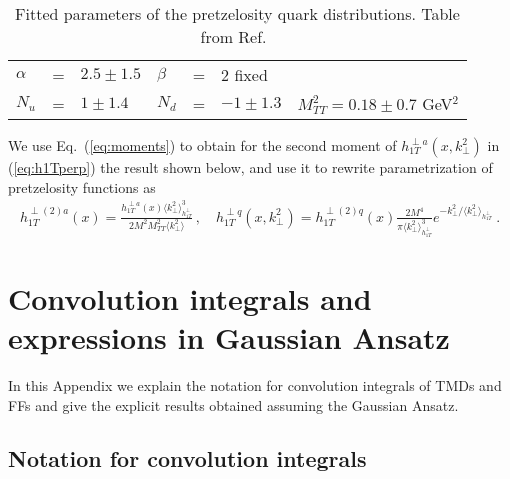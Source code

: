 \documentclass[a4paper,11pt]{article}
\newcommand{\ba}{\begin{eqnarray}}
\newcommand{\ea}{\end{eqnarray}}
\newcommand{\la}{\langle}
\newcommand{\ra}{\rangle}
\def\kperp{k_\perp}
\def\avkperp{\la \kperp^2 \ra}
\begin{document}
%
\begin{table}[b]
\centering
\begin{tabular}{l c l l c l l}
\hline
$\alpha$ &=& $2.5\pm1.5$ & $\beta$ &=& $2$ fixed \\
 $N_{u}$ &=& $1 \pm 1.4$ & $N_{d}$ &=& $-1 \pm 1.3$ &
 $M_{TT}^2=0.18 \pm  0.7$ GeV$^2$\\
\hline
\end{tabular}
\caption{Fitted parameters of the pretzelosity quark distributions. Table from Ref.~\cite{Lefky:2014eia}}
\label{fitparI}
\end{table}
%

We use Eq.~(\ref{eq:moments}) to obtain for the second moment
of $ h_{1T}^{\perp a}(x,\kperp^2)$ in (\ref{eq:h1Tperp}) the result
shown below, and use it to rewrite parametrization of pretzelosity
functions as
\ba
h_{1T}^{\perp (2) a}(x) =  \frac{h^{\perp a}_{1T}(x) \avkperp_{h_{1T}^\perp}^3}{2 M^2 M_{TT}^2 \avkperp} \, , \quad
h_{1T}^{\perp q}(x,\kperp^2) =  h_{1T}^{\perp (2) q}(x)   \frac{2 M^4}{\pi \avkperp_{h_{1T}^\perp}^3} e^{-\kperp^2/{\avkperp_{h_{1T}^\perp}}}
\label{pretzelosity_new} \ .
\ea

\section{Convolution integrals and expressions in Gaussian Ansatz}
\label{App:factor}

In this Appendix we explain the notation for convolution integrals
of TMDs and FFs and give the explicit results obtained assuming the
Gaussian Ansatz.

\subsection{Notation for convolution integrals \label{ApendixB1}}
\end{document}
